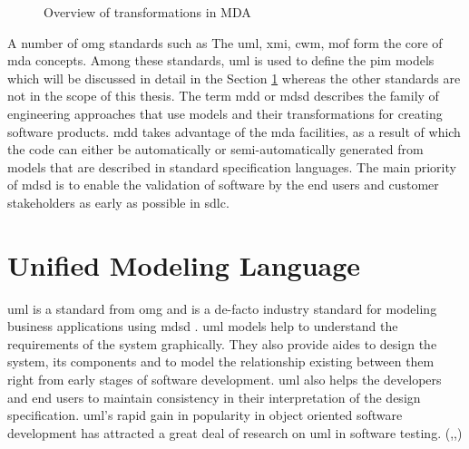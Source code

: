 \begin{figure}[htb!]
\centering
{}
\caption{Overview of transformations in MDA \cite{cerny2015separation}}
\label{fig:Overview_MDA}
\end{figure}

A number of \gls{omg} standards such as The \gls{uml}, \gls{xmi}, \gls{cwm}, \gls{mof} form the core of \gls{mda} concepts. Among these standards, \gls{uml} is used to define the \gls{pim} models which will be discussed in detail in the Section \ref{secuml} whereas the other standards are not in the scope of this thesis.
The term \gls{mdd} or \gls{mdsd} describes the family of engineering approaches that use models and their transformations for creating software products. \gls{mdd} takes advantage of the \gls{mda} facilities, as a result of which the code can either be automatically or semi-automatically generated from models that are described in standard specification languages. The main priority of \gls{mdsd} is to enable the validation of software by the end users and customer stakeholders as early as possible in \gls{sdlc}.


\section{Unified Modeling Language} \label{secuml}
\gls{uml} is a standard from \gls{omg} and is a de-facto industry standard for modeling business applications using \gls{mdsd} \cite{cerny2015separation}. \gls{uml} models help to understand the requirements of the system graphically. They also provide aides to design the system, its components and to model the relationship existing between them right from early stages of software development. \gls{uml} also helps the developers and end users to maintain consistency in their interpretation of the design specification. \gls{uml}’s rapid gain in popularity in object oriented software development has attracted a great deal of research on \gls{uml} in software testing. (\cite{nebut2003requirements},\cite{badri2003use},\cite{nebut2003requirements})

